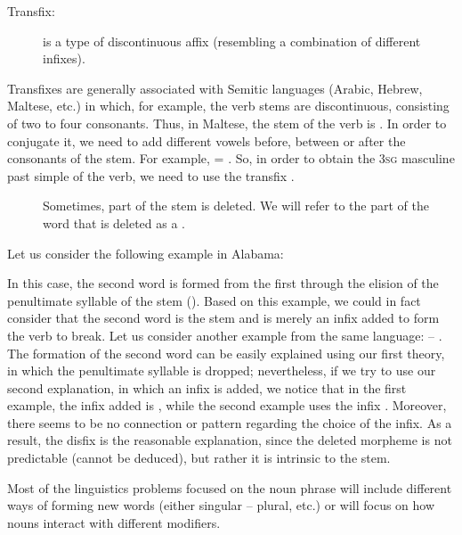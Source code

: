\begin{refsection}
\begin{description}
    \item[Transfix:] is a type of discontinuous affix (resembling a combination of different infixes).
\end{description}

 Transfixes are generally associated with Semitic languages (Arabic, Hebrew, Maltese, etc.) in which, for example, the verb stems are discontinuous, consisting of two to four consonants. Thus, in Maltese, the stem of the verb  is . In order to conjugate it, we need to add different vowels before, between or after the consonants of the stem. For example,  = . So, in order to obtain the 3\textsc{sg} masculine past simple of the verb, we need to use the transfix .

\begin{description}
    \item[] Sometimes, part of the stem is deleted. We will refer to the part of the word that is deleted as a .
\end{description}

 Let us consider the following example in Alabama:


 In this case, the second word is formed from the first through the elision of the penultimate syllable of the stem (). Based on this example, we could in fact consider that the second word is the stem and  is merely an infix added to form the verb to break. Let us consider another example from the same language:  – . The formation of the second word can be easily explained using our first theory, in which the penultimate syllable is dropped; nevertheless, if we try to use our second explanation, in which an infix is added, we notice that in the first example, the infix added is , while the second example uses the infix . Moreover, there seems to be no connection or pattern regarding the choice of the infix. As a result, the disfix is the reasonable explanation, since the deleted morpheme is not predictable (cannot be deduced), but rather it is intrinsic to the stem.

 Most of the linguistics problems focused on the noun phrase will include different ways of forming new words (either singular – plural, etc.) or will focus on how nouns interact with different modifiers.


\end{refsection}
